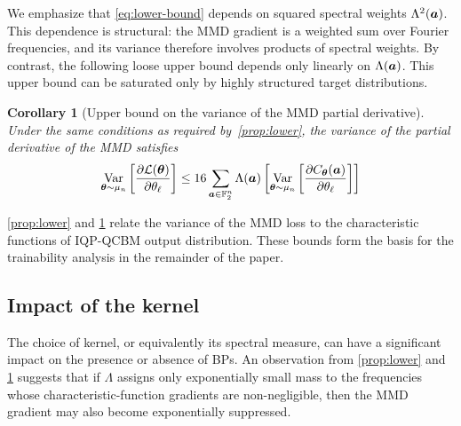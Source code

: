 \documentclass{article}
\theoremstyle{plain}
\newtheorem{corollary}[theorem]{Corollary}
\theoremstyle{definition}
\theoremstyle{remark}
\begin{document}
We emphasize that \cref{eq:lower-bound} depends on squared spectral weights $\Lambda^2({\bm{a}})$. This dependence is structural: the MMD gradient is a weighted sum over Fourier frequencies, and its variance therefore involves products of spectral weights. By contrast, the following loose upper bound depends only linearly on $\Lambda({\bm{a}})$. This upper bound can be saturated only by highly structured target distributions.
\begin{corollary}[Upper bound on the variance of the MMD partial derivative] \label{prop:upper} 
Under the same conditions as required by~\cref{prop:lower}, the variance of the partial derivative of the MMD satisfies
\begin{equation}
    \operatorname*{Var}_{{\bm{\theta}} \sim\mu_n} \left[ \frac{\partial \mathcal{L}({\bm{\theta}})}{\partial \theta_\ell} \right] \leq 16 \sum_{{\bm{a}}\in \mathbb{F}_2^n} \Lambda({\bm{a}})\left[  \operatorname*{Var}_{{\bm{\theta}}\sim\mu_n} \left[ \frac{\partial C_{\bm{\theta}}({\bm{a}})}{\partial \theta_\ell} \right]\right]
\end{equation}
\end{corollary}
\cref{prop:lower} and \cref{prop:upper} relate the variance of the MMD loss to the characteristic functions of IQP-QCBM output distribution. These bounds form the basis for the trainability analysis in the remainder of the paper.

\subsection{Impact of the kernel}
\label{subsec:kernel-choice}
The choice of kernel, or equivalently its spectral measure, can have a significant impact on the presence or absence of BPs. An observation from \cref{prop:lower} and \cref{prop:upper} suggests that if $\Lambda$ assigns only exponentially small mass to the frequencies whose characteristic-function gradients are non-negligible, then the MMD gradient may also become exponentially suppressed. 
\end{document}
